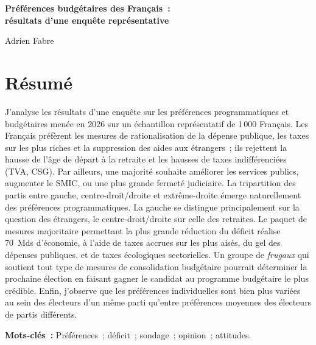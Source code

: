 \documentclass[12pt]{article}
\begin{document}
\begin{center}
  {\Large\bfseries Préférences budgétaires des Français~:\\ résultats d'une enquête représentative\par}
  \medskip
  {\large Adrien Fabre\par}
\end{center}

\section*{Résumé}
J'analyse les résultats d'une enquête sur les préférences programmatiques et budgétaires menée en 2026 sur un échantillon représentatif de 1\,000 Français. Les Français préfèrent les mesures de rationalisation de la dépense publique, les taxes sur les plus riches et la suppression des aides aux étrangers~; ils rejettent la hausse de l'âge de départ à la retraite et les hausses de taxes indifférenciées (TVA, CSG). Par ailleurs, une majorité souhaite améliorer les services publics, augmenter le SMIC, ou une plus grande fermeté judiciaire. La tripartition des partis entre gauche, centre-droit/droite et extrême-droite émerge naturellement des préférences programmatiques. La gauche se distingue principalement sur la question des étrangers, le centre-droit/droite sur celle des retraites. Le paquet de mesures majoritaire permettant la plus grande réduction du déficit réalise 70~Mds d'économie, à l'aide de taxes accrues sur les plus aisés, du gel des dépenses publiques, et de taxes écologiques sectorielles. Un groupe de \textit{frugaux} qui soutient tout type de mesures de consolidation budgétaire pourrait déterminer la prochaine élection en faisant gagner le candidat au programme budgétaire le plus crédible. Enfin, j'observe que les préférences individuelles sont bien plus variées au sein des électeurs d'un même parti qu'entre préférences moyennes des électeurs de partis différents.

\medskip\noindent
\textbf{Mots-clés~:} Préférences~; déficit~; sondage~; opinion~; attitudes.
\end{document}
